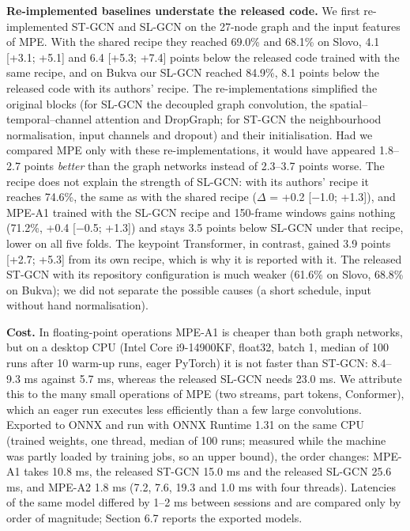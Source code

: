 \documentclass[a4paper,fleqn]{cas-dc}
\begin{document}
\textbf{Re-implemented baselines understate the released code.} We first re-implemented ST-GCN and SL-GCN on the 27-node graph and the input features of MPE. With the shared recipe they reached 69.0\% and 68.1\% on Slovo, 4.1 {[}+3.1; +5.1{]} and 6.4 {[}+5.3; +7.4{]} points below the released code trained with the same recipe, and on Bukva our SL-GCN reached 84.9\%, 8.1 points below the released code with its authors' recipe. The re-implementations simplified the original blocks (for SL-GCN the decoupled graph convolution, the spatial--temporal--channel attention and DropGraph; for ST-GCN the neighbourhood normalisation, input channels and dropout) and their initialisation. Had we compared MPE only with these re-implementations, it would have appeared 1.8--2.7 points \emph{better} than the graph networks instead of 2.3--3.7 points worse. The recipe does not explain the strength of SL-GCN: with its authors' recipe it reaches 74.6\%, the same as with the shared recipe (\(\Delta\) = +0.2 {[}$-$1.0; +1.3{]}), and MPE-A1 trained with the SL-GCN recipe and 150-frame windows gains nothing (71.2\%, +0.4 {[}$-$0.5; +1.3{]}) and stays 3.5 points below SL-GCN under that recipe, lower on all five folds. The keypoint Transformer, in contrast, gained 3.9 points {[}+2.7; +5.3{]} from its own recipe, which is why it is reported with it. The released ST-GCN with its repository configuration is much weaker (61.6\% on Slovo, 68.8\% on Bukva); we did not separate the possible causes (a short schedule, input without hand normalisation).

\textbf{Cost.} In floating-point operations MPE-A1 is cheaper than both graph networks, but on a desktop CPU (Intel Core i9-14900KF, float32, batch 1, median of 100 runs after 10 warm-up runs, eager PyTorch) it is not faster than ST-GCN: 8.4--9.3 ms against 5.7 ms, whereas the released SL-GCN needs 23.0 ms. We attribute this to the many small operations of MPE (two streams, part tokens, Conformer), which an eager run executes less efficiently than a few large convolutions. Exported to ONNX and run with ONNX Runtime 1.31 on the same CPU (trained weights, one thread, median of 100 runs; measured while the machine was partly loaded by training jobs, so an upper bound), the order changes: MPE-A1 takes 10.8 ms, the released ST-GCN 15.0 ms and the released SL-GCN 25.6 ms, and MPE-A2 1.8 ms (7.2, 7.6, 19.3 and 1.0 ms with four threads). Latencies of the same model differed by 1--2 ms between sessions and are compared only by order of magnitude; Section 6.7 reports the exported models.
\end{document}
